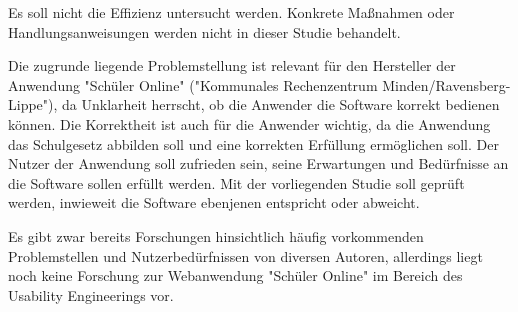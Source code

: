 Es soll nicht die Effizienz untersucht werden.
Konkrete Maßnahmen oder Handlungsanweisungen werden nicht in dieser Studie behandelt.

Die zugrunde liegende Problemstellung ist relevant für den Hersteller der Anwendung "Schüler Online" ("Kommunales Rechenzentrum Minden/Ravensberg-Lippe"), da Unklarheit herrscht, ob die Anwender die Software korrekt bedienen können. Die Korrektheit ist auch für die Anwender wichtig, da die Anwendung das Schulgesetz abbilden soll und eine korrekten Erfüllung ermöglichen soll. Der Nutzer der Anwendung soll zufrieden sein, seine Erwartungen und Bedürfnisse an die Software sollen erfüllt werden. Mit der vorliegenden Studie soll geprüft werden, inwieweit die Software ebenjenen entspricht oder abweicht.

Es gibt zwar bereits Forschungen hinsichtlich häufig vorkommenden Problemstellen und Nutzerbedürfnissen von diversen Autoren, 
allerdings liegt noch keine Forschung zur Webanwendung "Schüler Online" im Bereich des Usability Engineerings vor. 
